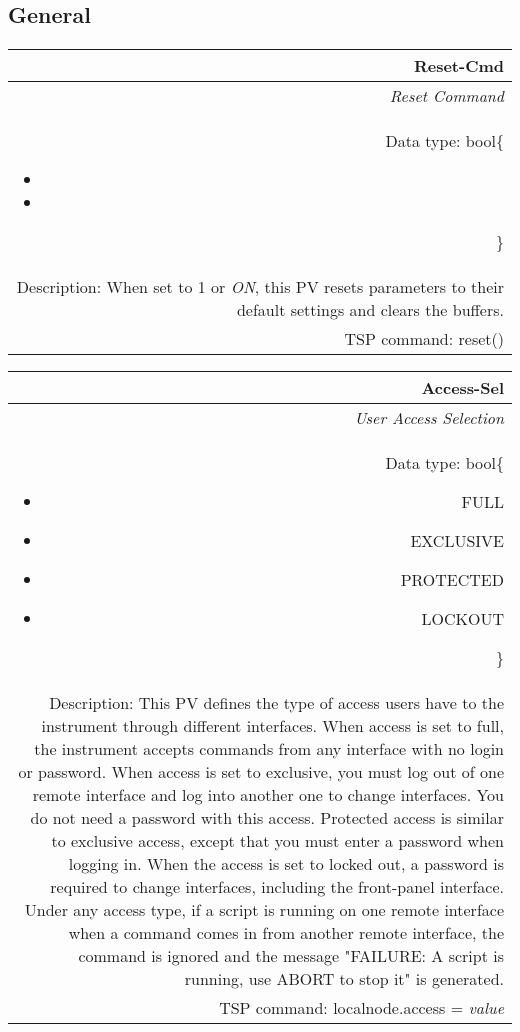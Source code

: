 \documentclass[openany]{article}
\begin{document}
	\subsection{General}\label{pvgroup:general}

		\paragraph{} %

		\begin{tabular}{N}
			\hline
			\bfseries Reset-Cmd\label{pv:reset-cmd} \\ \hline
			\emph{Reset Command} \\
			Data type: bool\{\begin{itemize}[noitemsep]
				\small
				\item[] 
				\item[] 
			\end{itemize}\} \\
			Description: When set to 1 or \emph{ON}, this PV resets parameters to their default settings and clears the buffers. \\
			TSP command: reset()
		\end{tabular}

		\begin{tabular}{N}
			\hline
			\bfseries Access-Sel\label{pv:access-sel} \\ \hline
			\emph{User Access Selection} \\
			Data type: bool\{\begin{itemize}[noitemsep]
				\small
				\item[] FULL
				\item[] EXCLUSIVE
				\item[] PROTECTED
				\item[] LOCKOUT
			\end{itemize}\} \\
			Description: This PV defines the type of access users have to the instrument through different interfaces. When access is set to full, the instrument accepts commands from any interface with no login or password. When access is set to exclusive, you must log out of one remote interface and log into another one to change interfaces. You do not need a password with this access. Protected access is similar to exclusive access, except that you must enter a password when logging in. When the access is set to locked out, a password is required to change interfaces, including the front-panel interface. Under any access type, if a script is running on one remote interface when a command comes in from another remote interface, the command is ignored and the message "FAILURE: A script is running, use ABORT to stop it" is generated. \\
			TSP command: localnode.access = \emph{value}
		\end{tabular}
\end{document}
